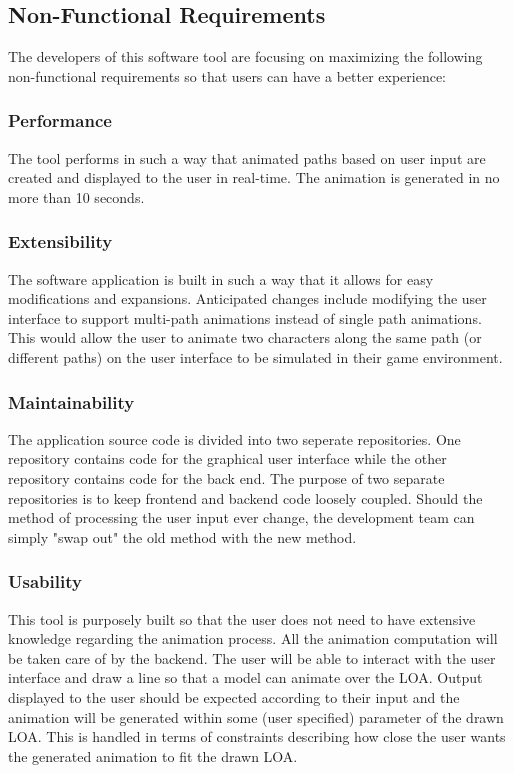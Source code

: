\subsection{Non-Functional Requirements}
The developers of this software tool are focusing on maximizing the following non-functional requirements so that users can have a better experience:

\subsubsection{Performance}
The tool performs in such a way that animated paths based on user input are created and displayed to the user in real-time. The animation is generated in no more than 10 seconds. 

\subsubsection{Extensibility}
The software application is built in such a way that it allows for easy modifications and expansions. Anticipated changes include modifying the user interface to support multi-path animations instead of single path animations. This would allow the user to animate two characters along the same path (or different paths) on the user interface to be simulated in their game environment.

\subsubsection{Maintainability}
The application source code is divided into two seperate repositories. One repository contains code for the graphical user interface while the other repository contains code for the back end. The purpose of two separate repositories is to keep frontend and backend code loosely coupled. Should the method of processing the user input ever change, the development team can simply "swap out" the old method with the new method.

\subsubsection{Usability}
This tool is purposely built so that the user does not need to have extensive knowledge regarding the animation process. All the animation computation will be taken care of by the backend. The user will be able to interact with the user interface and draw a line so that a model can animate over the LOA. Output displayed to the user should be expected according to their input and the animation will be generated within some (user specified) parameter of the drawn LOA. This is handled in terms of constraints describing how close the user wants the generated animation to fit the drawn LOA.

